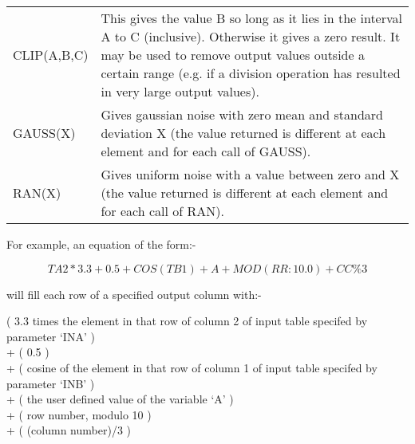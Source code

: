 \begin{small}
{{\begin{enumerate}
    \begin{tabular}{lp{4in}}
    CLIP(A,B,C) & This gives the value B so long as it lies in the
                 interval A to C (inclusive). Otherwise it gives a
                 zero result. It may be used to remove output values
                 outside a certain range (e.g. if a division operation
                 has resulted in very large output values). \\
    GAUSS(X)    & Gives gaussian noise with zero mean and standard
                 deviation X (the value returned is different at each
                 element and for each call of GAUSS). \\
    RAN(X)      & Gives uniform noise with a value between zero and X
                 (the value returned is different at each element and
                 for each call of RAN). \\
    \end{tabular}
  \end{enumerate}

  For example, an equation of the form:-

 $$        TA2*3.3 + 0.5 + COS(TB1) + A + MOD(RR:10.0) + CC\%3 $$

  will fill each row of a specified output column with:-

 \hspace*{1.0em}( 3.3 times the element in that row of column 2 of input
    table specifed by parameter `INA' ) \hspace*{\fill} \\
  + ( 0.5 ) \hspace*{\fill} \\
  + ( cosine of the element in that row of column 1 of input table
    specifed by parameter `INB' )
   \hspace*{\fill} \\
  + ( the user defined value of the variable `A' ) \hspace*{\fill} \\
  + ( row number, modulo 10 ) \hspace*{\fill} \\
  + ( (column number)/3 ) \hspace*{\fill} \\


}\sstparameters{

}}
\end{small}
